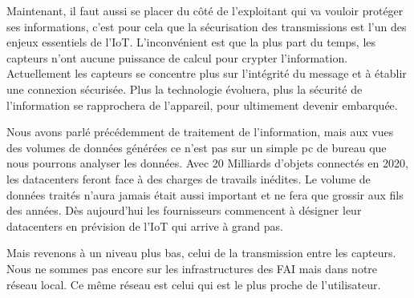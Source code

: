 
Maintenant, il faut aussi se placer du côté de l'exploitant qui va vouloir protéger ses informations, c'est pour cela que la sécurisation des transmissions est l'un des enjeux essentiels de l'IoT. L'inconvénient est que la plus part du temps, les capteurs n'ont aucune puissance de calcul pour crypter l'information. Actuellement les capteurs se concentre plus sur l'intégrité du message et à établir une connexion sécurisée. Plus la technologie évoluera, plus la sécurité de l'information se rapprochera de l'appareil, pour ultimement devenir embarquée. 


Nous avons parlé précédemment de traitement de l'information, mais aux vues des volumes de données générées ce n'est pas sur un simple pc de bureau que nous pourrons analyser les données. Avec 20 Milliards d'objets connectés en 2020, les datacenters feront face à des charges de travails inédites. Le volume de données traités n'aura jamais était aussi important et ne fera que grossir aux fils des années. Dès aujourd'hui les fournisseurs commencent à désigner leur datacenters en prévision de l'IoT qui arrive à grand pas.

Mais revenons à un niveau plus bas, celui de la transmission entre les capteurs. Nous ne sommes pas encore sur les infrastructures des FAI mais dans notre réseau local. Ce même réseau est celui qui est le plus proche de l'utilisateur. 

